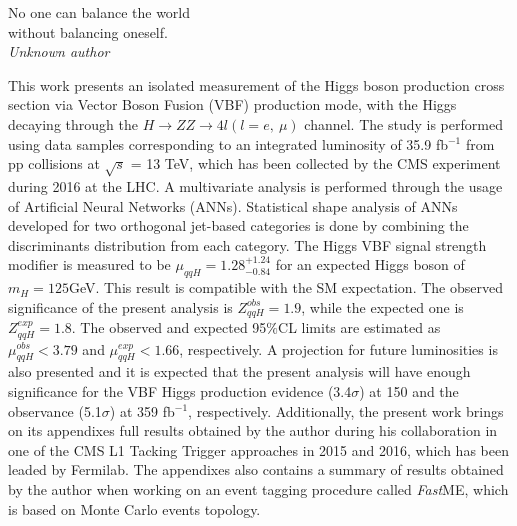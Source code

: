 \documentclass[a4paper,12pt,oneside,onecolumn,final,fleqn]{repUERJ}
\begin{document}
\pretextualchapter{}
\vfill
\begin{flushright}
No one can balance the world\\ 
without balancing oneself.\\
\textit{Unknown author}
\end{flushright}

This work presents an isolated measurement of the Higgs boson production cross section via Vector Boson Fusion (VBF) production mode, with the Higgs decaying through the $H \rightarrow ZZ \rightarrow 4l (l=e,~\mu)$ channel. The study is performed using data samples corresponding to an integrated luminosity of 35.9 fb$^{-1}$ from pp collisions at $\sqrt{s}$ = 13 TeV, which has been collected by the CMS experiment during 2016 at the LHC. A multivariate analysis is performed through the usage of Artificial Neural Networks (ANNs). Statistical shape analysis of ANNs developed for two orthogonal jet-based categories is done by combining the discriminants distribution from each category. The Higgs VBF signal strength modifier is measured to be $\mu_{qqH} = 1.28^{+1.24}_{-0.84}$ for an expected Higgs boson of $m_{H} = 125$GeV. This result is compatible with the SM expectation. The observed significance of the present analysis is $Z_{qqH}^{obs} = 1.9$, while the expected one is $Z_{qqH}^{exp} = 1.8$. The observed and expected 95$\%$CL limits are estimated as $\mu_{qqH}^{obs} < 3.79$ and $\mu_{qqH}^{exp} < 1.66$, respectively. A projection for future luminosities is also presented and it is expected that the present analysis will have enough significance for the VBF Higgs production evidence (3.4$\sigma$) at 150 and the observance (5.1$\sigma$) at 359 fb$^{-1}$, respectively. Additionally, the present work brings on its appendixes full results obtained by the author during his collaboration in one of the CMS L1 Tacking Trigger approaches in 2015 and 2016, which has been leaded by Fermilab. The appendixes also contains a summary of results obtained by the author when working on an event tagging procedure called \textit{Fast}ME, which is based on Monte Carlo events topology.

\printkeys %
\end{document}
